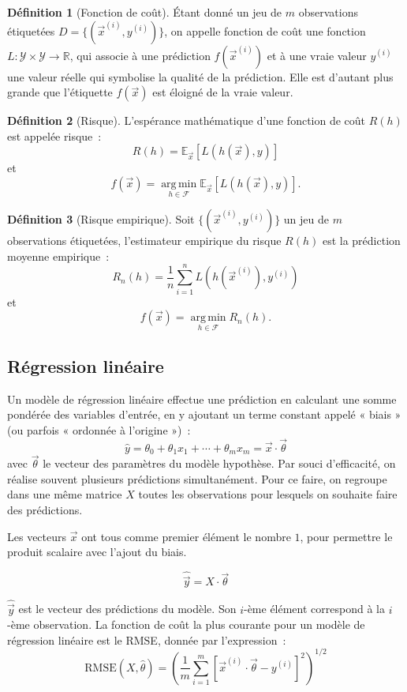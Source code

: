 \documentclass[a4paper,12pt,twoside]{report}
\theoremstyle{definition}
\newtheorem{defi}{Définition}
\theoremstyle{plain}
\theoremstyle{remark}
\begin{document}
\begin{defi}[Fonction de coût]
	Étant donné un jeu de $m$ observations étiquetées $D = \{(\vec{x}^{(i)}, y^{(i)})\}$, on appelle fonction de coût une fonction $L : \mathcal{Y} \times \mathcal{Y} \to \mathbb{R}$, qui associe à une prédiction $f(\vec{x}^{(i)})$ et à une vraie valeur $y^{(i)}$ une valeur réelle qui symbolise la qualité de la prédiction. Elle est d'autant plus grande que l'étiquette $f(\vec{x})$ est éloigné de la vraie valeur.
\end{defi}

\begin{defi}[Risque]
	L'espérance mathématique d'une fonction de coût $R(h)$ est appelée risque~:
	\[ R(h) = \mathbb{E}_{\vec{x}} \left[ L(h(\vec{x}), y) \right] \]
	et
	\[ f(\vec{x}) = \operatorname*{arg\,min}_{h \in \mathcal{F}} \mathbb{E}_{\vec{x}} \left[ L(h(\vec{x}), y) \right]. \]
\end{defi}

\begin{defi}[Risque empirique]
	Soit $\{(\vec{x}^{(i)}, y^{(i)})\}$ un jeu de $m$ observations étiquetées, l'estimateur empirique du risque $R(h)$ est la prédiction moyenne empirique~:
	\[ R_n(h) = \frac{1}{n} \sum_{i=1}^{n} L(h(\vec{x}^{(i)}), y^{(i)}) \]
	et
	\[ f(\vec{x}) = \operatorname*{arg\,min}_{h \in \mathcal{F}} R_n(h). \]
\end{defi}

\subsection{Régression linéaire}

Un modèle de régression linéaire effectue une prédiction en calculant une somme pondérée des variables d'entrée, en y ajoutant un terme constant appelé « biais » (ou parfois « ordonnée à l'origine »)~:
\[ \hat{y} = \theta_0 + \theta_1 x_1 + \cdots + \theta_m x_m = \vec{x} \cdot \vec{\theta} \]
avec $\vec{\theta}$ le vecteur des paramètres du modèle hypothèse. Par souci d'efficacité, on réalise souvent plusieurs prédictions simultanément. Pour ce faire, on regroupe dans une même matrice $X$ toutes les observations pour lesquels on souhaite faire des prédictions.

Les vecteurs $\vec{x}$ ont tous comme premier élément le nombre $1$, pour permettre le produit scalaire avec l'ajout du biais.

\[ \hat{\vec{y}} = X \cdot \vec{\theta} \]

$\hat{\vec{y}}$ est le vecteur des prédictions du modèle. Son $i$-ème élément correspond à la $i$-ème observation. La fonction de coût la plus courante pour un modèle de régression linéaire est le \ac{RMSE}, donnée par l'expression~:
\[ \mathrm{RMSE}(X, \hat{\theta}) = \left( \frac{1}{m} \sum_{i=1}^{m} \left[ \vec{x}^{(i)} \cdot \vec{\theta} - y^{(i)} \right]^2 \right)^{1/2} \]
\end{document}
